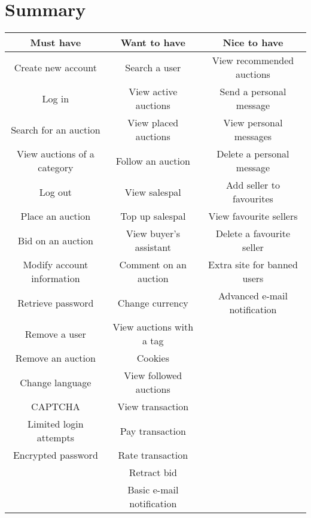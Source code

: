 \section{Summary}
	\begin{tabular}{|c|c|c|}	
		\hline \textbf{Must have} & \textbf{Want to have} & \textbf{Nice to have} \\ 
		\hline  Create new account & Search a user & View recommended auctions \\ 
		\hline  Log in & View active auctions & Send a personal message \\ 
		\hline  Search for an auction & View placed auctions & View personal messages \\
		\hline  View auctions of a category & Follow an auction & Delete a personal message \\ 
		\hline  Log out & View salespal & Add seller to favourites \\ 
		\hline  Place an auction & Top up salespal & View favourite sellers \\ 
		\hline  Bid on an auction & View buyer's assistant &  Delete a favourite seller\\ 
		\hline  Modify account information & Comment on an auction & Extra site for banned users \\ 
		\hline  Retrieve password & Change currency & Advanced e-mail notification \\ 
		\hline  Remove a user & View auctions with a tag &  \\ 
		\hline  Remove an auction & Cookies &  \\ 
		\hline  Change language & View followed auctions &  \\ 
		\hline  CAPTCHA & View transaction &  \\ 
		\hline  Limited login attempts & Pay transaction  &  \\ 
		\hline  Encrypted password & Rate transaction  &  \\
		\hline   & Retract bid  &  \\
		\hline   & Basic e-mail notification &  \\
		\hline
	\end{tabular} 